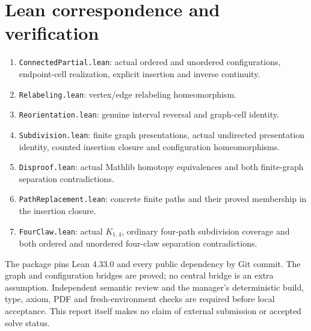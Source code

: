 \documentclass[11pt]{article}
\begin{document}
\section*{Lean correspondence and verification}
\begin{enumerate}
\item \texttt{ConnectedPartial.lean}: actual ordered and unordered configurations,
endpoint-cell realization, explicit insertion and inverse continuity.
\item \texttt{Relabeling.lean}: vertex/edge relabeling homeomorphism.
\item \texttt{Reorientation.lean}: genuine interval reversal and graph-cell identity.
\item \texttt{Subdivision.lean}: finite graph presentations, actual undirected
presentation identity, counted insertion closure and configuration homeomorphisms.
\item \texttt{Disproof.lean}: actual Mathlib homotopy equivalences and both
finite-graph separation contradictions.
\item \texttt{PathReplacement.lean}: concrete finite paths and their proved
membership in the insertion closure.
\item \texttt{FourClaw.lean}: actual $K_{1,4}$, ordinary four-path subdivision
coverage and both ordered and unordered four-claw separation contradictions.
\end{enumerate}
The package pins Lean 4.33.0 and every public dependency by Git commit. The graph
and configuration bridges are proved; no central bridge is an extra assumption.
Independent semantic review and the manager's deterministic build, type, axiom,
PDF and fresh-environment checks are required before local acceptance. This report
itself makes no claim of external submission or accepted solve status.
\end{document}
